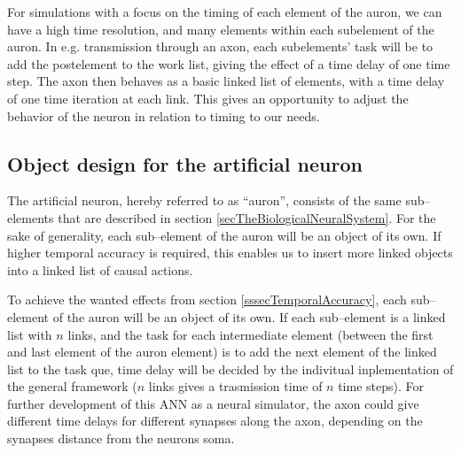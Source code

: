 		
		For simulations with a focus on the timing of each element of the auron, we can have a high time resolution, and many elements within each subelement of the auron.
		In e.g. transmission through an axon, each subelements' task will be to add the postelement to the work list,%
			giving the effect of a time delay of one time step. 
		The axon then behaves as a basic linked list of elements, with a time delay of one time iteration at each link.
		This gives an opportunity to adjust the behavior of the neuron in relation to timing to our needs.



	\subsection{Object design for the artificial neuron} 								%
	The artificial neuron, hereby referred to as ``auron'', consists of the same sub--elements that are described in section \ref{secTheBiologicalNeuralSystem}.
	For the sake of generality, each sub--element of the auron will be an object of its own. If higher temporal accuracy is required, this enables us to insert more linked objects into a linked list of causal actions. %

	To achieve the wanted effects from section \ref{sssecTemporalAccuracy}, each sub--element of the auron will be an object of its own. 			  %
	If each sub--element is a linked list with $n$ links, and the task for each intermediate element (between the first and last element of the auron element) is to add the next element of the linked list to the task que, 
		time delay will be decided by the indivitual inplementation of the general framework ($n$ links gives a trasmission time of $n$ time steps).
	For further development of this ANN as a neural simulator, the axon could give different time delays for different synapses along the axon, depending on the synapses distance from the neurons soma.

